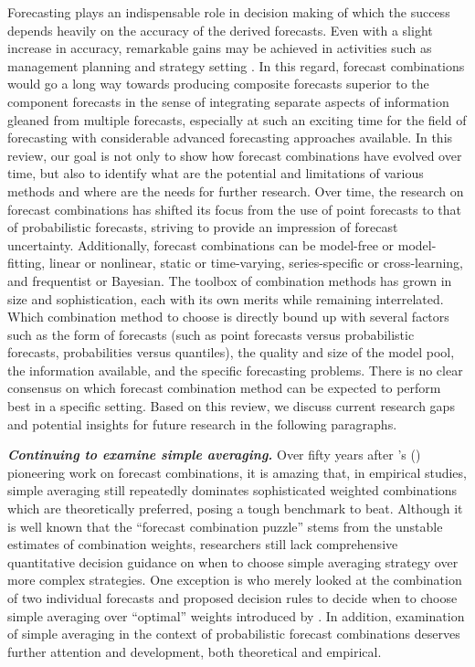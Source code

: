 \documentclass[11pt]{article}
\def\citeapos#1{\citeauthor{#1}'s (\citeyear{#1})}
\begin{document}
Forecasting plays an indispensable role in decision making of which the success depends heavily on the accuracy of the derived forecasts. Even with a slight increase in accuracy, remarkable gains may be achieved in activities such as management planning and strategy setting \citep{Makridakis1996-cf,Syntetos2009-ho,Hyndman2021-tx,Petropoulos2021-ft}. In this regard, forecast combinations would go a long way towards producing composite forecasts superior to the component forecasts in the sense of integrating separate aspects of information gleaned from multiple forecasts, especially at such an exciting time for the field of forecasting with considerable advanced forecasting approaches available. In this review, our goal is not only to show how forecast combinations have evolved over time, but also to identify what are the potential and limitations of various methods and where are the needs for further research. Over time, the research on forecast combinations has shifted its focus from the use of point forecasts to that of probabilistic forecasts, striving to provide an impression of forecast uncertainty. Additionally, forecast combinations can be model-free or model-fitting, linear or nonlinear, static or time-varying, series-specific or cross-learning, and frequentist or Bayesian. The toolbox of combination methods has grown in size and sophistication, each with its own merits while remaining interrelated. Which combination method to choose is directly bound up with several factors such as the form of forecasts (such as point forecasts versus probabilistic forecasts, probabilities versus quantiles), the quality and size of the model pool, the information available, and the specific forecasting problems. There is no clear consensus on which forecast combination method can be expected to perform best in a specific setting. Based on this review, we discuss current research gaps and potential insights for future research in the following paragraphs.

\textbf{\textit{Continuing to examine simple averaging.}} Over fifty years after \citeapos{Bates1969-yj} pioneering work on forecast combinations, it is amazing that, in empirical studies, simple averaging still repeatedly dominates sophisticated weighted combinations which are theoretically preferred, posing a tough benchmark to beat. Although it is well known that the ``forecast combination puzzle'' stems from the unstable estimates of combination weights, researchers still lack comprehensive quantitative decision guidance on when to choose simple averaging strategy over more complex strategies. One exception is \citet{Blanc2016-sn} who merely looked at the combination of two individual forecasts and proposed decision rules to decide when to choose simple averaging over ``optimal'' weights introduced by \citet{Bates1969-yj}. In addition, examination of simple averaging in the context of probabilistic forecast combinations deserves further attention and development, both theoretical and empirical.
\end{document}
